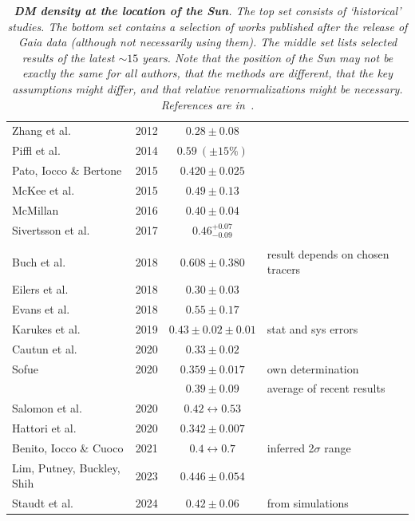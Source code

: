 \begin{table}[!t]
\begin{center}
{\begin{tabular}{l|c|c|l}
Zhang et al. 			& 2012 	& $0.28 \pm 0.08$ & \\[1mm]\rowcolor[rgb]{0.97,0.97,0.93}
Piffl et al. 				& 2014 	& $0.59\ (\pm 15\%)$ & \\[1mm]\rowcolor[rgb]{0.97,0.97,0.93}
Pato, Iocco \& Bertone 	& 2015 	& $0.420 \pm 0.025$ &  \\[1mm]\rowcolor[rgb]{0.97,0.97,0.93}
McKee et al.			& 2015 	& $0.49 \pm 0.13$ &  \\[1mm]\rowcolor[rgb]{0.97,0.97,0.93}
McMillan 				& 2016 	& $0.40 \pm 0.04$ &  \\[1mm]\rowcolor[rgb]{0.97,0.97,0.93}
Sivertsson et al.		& 2017 	& $0.46^{+0.07}_{-0.09}$ &  \\[1mm]
\hdashline \rowcolor[rgb]{0.99,0.97,0.97}
& & &  \\[-2mm] \rowcolor[rgb]{0.99,0.97,0.97}
Buch et al. 			& 2018 	& $0.608 \pm 0.380$ &  {result depends on chosen tracers}  \\[1mm] \rowcolor[rgb]{0.99,0.97,0.97}
Eilers et al.			& 2018	& $0.30 \pm 0.03$ & \\[1mm]\rowcolor[rgb]{0.99,0.97,0.97}
Evans et al.			& 2018	& $0.55 \pm 0.17$ & \\[1mm]\rowcolor[rgb]{0.99,0.97,0.97}
Karukes et al. 			& 2019 	& $0.43 \pm 0.02 \pm 0.01 $ &  {stat and sys errors}  \\[1mm]\rowcolor[rgb]{0.99,0.97,0.97}
Cautun et al.			& 2020	& $0.33 \pm 0.02$ & \\[1mm]\rowcolor[rgb]{0.99,0.97,0.97}
Sofue				& 2020	& $0.359 \pm 0.017$ & {own determination} \\\rowcolor[rgb]{0.99,0.97,0.97}
					& 		& $0.39 \pm 0.09$ & {average of recent results} \\[1mm]\rowcolor[rgb]{0.99,0.97,0.97}
Salomon et al.			& 2020	& $0.42 \leftrightarrow 0.53 $ & \\[1mm]		\rowcolor[rgb]{0.99,0.97,0.97}				
Hattori et al.			& 2020	& $0.342 \pm 0.007$ & \\[1mm]		\rowcolor[rgb]{0.99,0.97,0.97}			
Benito, Iocco \& Cuoco 	& 2021 	& $0.4 \leftrightarrow 0.7$ & {inferred 2$\sigma$ range} \\[1mm]	\rowcolor[rgb]{0.99,0.97,0.97}
Lim, Putney, Buckley, Shih 	& 2023 	& $0.446 \pm 0.054$ & \\[1mm]	\rowcolor[rgb]{0.99,0.97,0.97}
Staudt et al. 			& 2024	& $0.42 \pm 0.06$  & from simulations
\end{tabular}}
\end{center}
\vspace{-5mm}
\caption[DM density at the location of the Sun]{\em\label{tab:rhodot} {\bfseries DM density at the location of the Sun}. The top set consists of `historical' studies. The bottom set contains a selection of works published after the release of {\sc Gaia} data (although not necessarily using them). The middle set lists selected results of the latest $\sim 15$ years. Note that the position of the Sun may not be exactly the same for all authors, that the methods are different, that the key assumptions might differ, and that relative renormalizations might be necessary. References are in~\cite{rhoSun}. }
\end{table}
\renewcommand{\arraystretch}{1}


